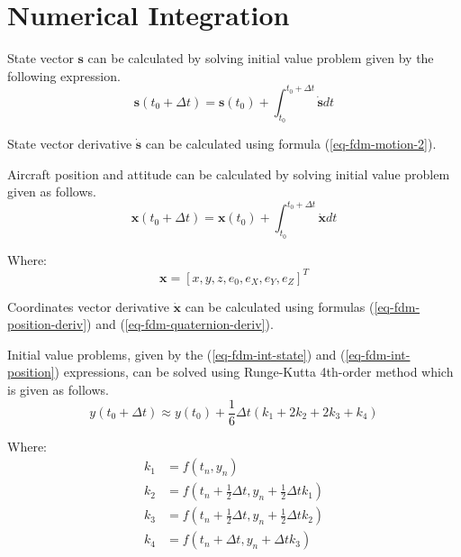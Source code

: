 \section{Numerical Integration}

State vector $\boldsymbol s$ can be calculated by solving initial value problem given by the following expression.
\begin{equation}
  \label{eq-fdm-int-state}
  {\boldsymbol s} \left( t_0 + \Delta t \right)
  =
  {\boldsymbol s} \left( t_0 \right)
  +
  \int_{t_0}^{t_0 + \Delta t} \dot {\boldsymbol s} dt
\end{equation}


State vector derivative $\dot {\boldsymbol s}$ can be calculated using formula (\ref{eq-fdm-motion-2}).

Aircraft position and attitude can be calculated by solving initial value problem given as follows.
\begin{equation}
  \label{eq-fdm-int-position}
  {\boldsymbol x} \left( t_0 + \Delta t \right)
  =
  {\boldsymbol x} \left( t_0 \right)
  +
  \int_{t_0}^{t_0 + \Delta t} \dot {\boldsymbol x} dt
\end{equation}

Where:
\begin{equation}
  {\boldsymbol x}
  =
  \left[
    x, y, z, e_0, e_X, e_Y, e_Z
  \right]^T
\end{equation}

Coordinates vector derivative $\dot {\boldsymbol x}$ can be calculated using formulas (\ref{eq-fdm-position-deriv}) and (\ref{eq-fdm-quaternion-deriv}).

Initial value problems, given by the (\ref{eq-fdm-int-state}) and (\ref{eq-fdm-int-position}) expressions, can be solved using Runge-Kutta 4th-order method which is given as follows. \cite{Press2007, Krupowicz1986, BaronPiatek2004}
\begin{equation}
  y \left( t_0 + \Delta t \right)
  \approx
  y \left( t_0 \right)
  +
  \frac{1}{6} \Delta t \left( k_1 + 2 k_2 + 2 k_3 + k_4 \right)
\end{equation}

Where:
\begin{align}
  k_1 &=
  f \left( t_n, y_n \right) \\
  k_2 &=
  f \left( t_n + \frac{1}{2} \Delta t, y_n + \frac{1}{2} \Delta t k_1 \right) \\
  k_3 &= 
  f \left( t_n + \frac{1}{2} \Delta t, y_n + \frac{1}{2} \Delta t k_2 \right) \\
  k_4 &= 
  f \left( t_n + \Delta t, y_n + \Delta t k_3 \right) \\
\end{align}
